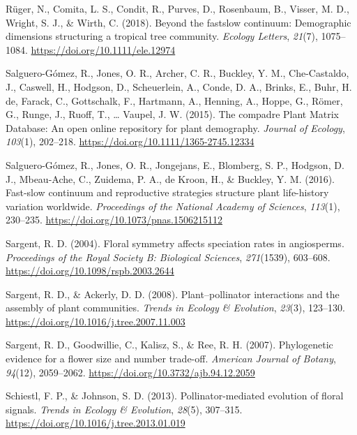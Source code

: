\documentclass[
  12pt,
  a4paper,
]{article}
\newlength{\cslhangindent}
\newlength{\cslentryspacingunit} %
\newenvironment{CSLReferences}[2] %
 {%
  \setlength{\parindent}{0pt}
  \ifodd #1
  \let\oldpar\par
  \def\par{\hangindent=\cslhangindent\oldpar}
  \fi
  \setlength{\parskip}{#2\cslentryspacingunit}
 }%
 {}
\begin{document}
\begin{CSLReferences}{1}{0}
\leavevmode{}%
Rüger, N., Comita, L. S., Condit, R., Purves, D., Rosenbaum, B., Visser, M. D., Wright, S. J., \& Wirth, C. (2018). Beyond the fast\textendash slow continuum: Demographic dimensions structuring a tropical tree community. \emph{Ecology Letters}, \emph{21}(7), 1075--1084. \url{https://doi.org/10.1111/ele.12974}

\leavevmode{}%
Salguero-Gómez, R., Jones, O. R., Archer, C. R., Buckley, Y. M., Che-Castaldo, J., Caswell, H., Hodgson, D., Scheuerlein, A., Conde, D. A., Brinks, E., Buhr, H. de, Farack, C., Gottschalk, F., Hartmann, A., Henning, A., Hoppe, G., Römer, G., Runge, J., Ruoff, T., \ldots{} Vaupel, J. W. (2015). The compadre {Plant Matrix Database}: An open online repository for plant demography. \emph{Journal of Ecology}, \emph{103}(1), 202--218. \url{https://doi.org/10.1111/1365-2745.12334}

\leavevmode{}%
Salguero-Gómez, R., Jones, O. R., Jongejans, E., Blomberg, S. P., Hodgson, D. J., Mbeau-Ache, C., Zuidema, P. A., de Kroon, H., \& Buckley, Y. M. (2016). Fast-slow continuum and reproductive strategies structure plant life-history variation worldwide. \emph{Proceedings of the National Academy of Sciences}, \emph{113}(1), 230--235. \url{https://doi.org/10.1073/pnas.1506215112}

\leavevmode{}%
Sargent, R. D. (2004). Floral symmetry affects speciation rates in angiosperms. \emph{Proceedings of the Royal Society B: Biological Sciences}, \emph{271}(1539), 603--608. \url{https://doi.org/10.1098/rspb.2003.2644}

\leavevmode{}%
Sargent, R. D., \& Ackerly, D. D. (2008). Plant--pollinator interactions and the assembly of plant communities. \emph{Trends in Ecology \& Evolution}, \emph{23}(3), 123--130. \url{https://doi.org/10.1016/j.tree.2007.11.003}

\leavevmode{}%
Sargent, R. D., Goodwillie, C., Kalisz, S., \& Ree, R. H. (2007). Phylogenetic evidence for a flower size and number trade-off. \emph{American Journal of Botany}, \emph{94}(12), 2059--2062. \url{https://doi.org/10.3732/ajb.94.12.2059}

\leavevmode{}%
Schiestl, F. P., \& Johnson, S. D. (2013). Pollinator-mediated evolution of floral signals. \emph{Trends in Ecology \& Evolution}, \emph{28}(5), 307--315. \url{https://doi.org/10.1016/j.tree.2013.01.019}


\end{CSLReferences}
\end{document}
